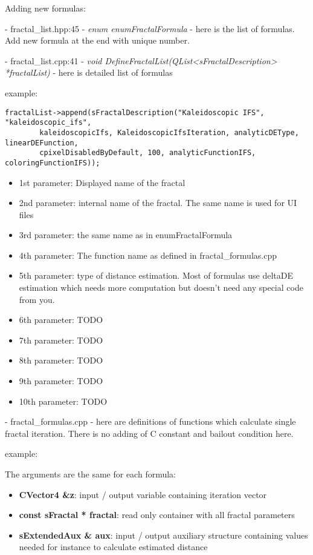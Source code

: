 Adding new formulas:

- fractal\_list.hpp:45 - \emph{enum enumFractalFormula} - here is the list of formulas. Add new formula at the end with unique number.

- fractal\_list.cpp:41 - \emph{void DefineFractalList(QList<sFractalDescription> *fractalList)} - here is detailed list of formulas

example:
\begin{lstlisting}
fractalList->append(sFractalDescription("Kaleidoscopic IFS", "kaleidoscopic_ifs",
		kaleidoscopicIfs, KaleidoscopicIfsIteration, analyticDEType, linearDEFunction,
		cpixelDisabledByDefault, 100, analyticFunctionIFS, coloringFunctionIFS));
\end{lstlisting}

\begin{itemize}
	\item 1st parameter: Displayed name of the fractal
	\item 2nd parameter: internal name of the fractal. The same name is used for UI files
	\item 3rd parameter: the same name as in enumFractalFormula
	\item 4th parameter: The function name as defined in fractal\_formulas.cpp
	\item 5th parameter: type of distance estimation. Most of formulas use deltaDE estimation which needs more computation
		but doesn't need any special code from you.
	\item 6th parameter: TODO
	\item 7th parameter: TODO
	\item 8th parameter: TODO
	\item 9th parameter: TODO
	\item 10th parameter: TODO
\end{itemize}

- fractal\_formulas.cpp - here are definitions of functions which calculate single fractal iteration. There is no adding of C constant and bailout condition here.

example:


The arguments are the same for each formula:
\begin{itemize}
	\item \textbf{CVector4 \&z}: input / output variable containing iteration vector
	\item \textbf{const sFractal * fractal}: read only container with all fractal parameters
	\item \textbf{sExtendedAux \& aux}: input / output auxiliary structure containing values 
		needed for instance to calculate estimated distance
\end{itemize}

